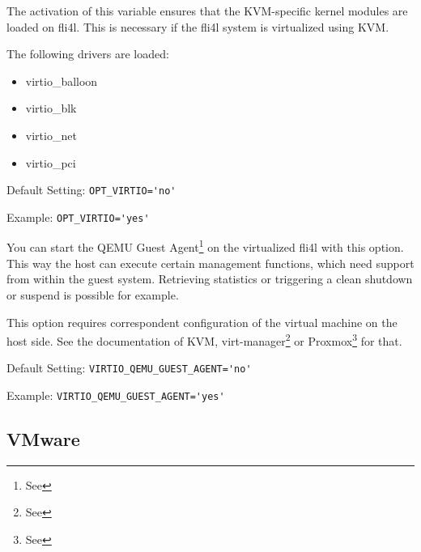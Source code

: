 \begin{description}

The activation of this variable ensures that the KVM-specific kernel modules
are loaded on fli4l. This is necessary if the fli4l system is virtualized using KVM.

The following drivers are loaded:

\begin{itemize}
   \item virtio\_balloon
   \item virtio\_blk
   \item virtio\_net
   \item virtio\_pci
\end{itemize}

Default Setting: \verb+OPT_VIRTIO='no'+

Example: \verb+OPT_VIRTIO='yes'+


You can start the QEMU Guest 
Agent\footnote{See } 
on the virtualized fli4l with this option. This way the host can execute
certain management functions, which need support from within the guest
system. Retrieving statistics or triggering a clean shutdown or suspend
is possible for example.

This option requires correspondent configuration of the virtual machine on the 
host side. See the documentation of KVM,
virt-manager\footnote{See } or
Proxmox\footnote{See } 
for that.

Default Setting: \verb+VIRTIO_QEMU_GUEST_AGENT='no'+

Example: \verb+VIRTIO_QEMU_GUEST_AGENT='yes'+

\end{description}

\subsection {VMware}

